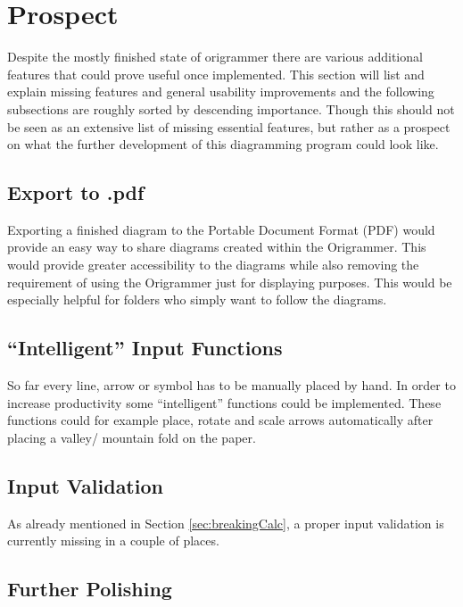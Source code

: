
\section{Prospect}
\label{sec:prospect}

Despite the mostly finished state of \gls{origrammer} there are various additional features that could prove useful once implemented. This section will list and explain missing features and general usability improvements and the following subsections are roughly sorted by descending importance. Though this should not be seen as an extensive list of missing essential features, but rather as a prospect on what the further development of this diagramming program could look like. 

\subsection{Export to .pdf}

Exporting a finished diagram to the Portable Document Format (PDF) would provide an easy way to share diagrams created within the Origrammer. This would provide greater accessibility to the diagrams while also removing the requirement of using the Origrammer just for displaying purposes. This would be especially helpful for folders who simply want to follow the diagrams.

\subsection{``Intelligent'' Input Functions}

So far every line, arrow or symbol has to be manually placed by hand. In order to increase productivity some ``intelligent'' functions could be implemented. These functions could for example place, rotate and scale arrows automatically after placing a valley/ mountain fold on the paper.

\subsection{Input Validation}

As already mentioned in Section \ref{sec:breakingCalc}, a proper input validation is currently missing in a couple of places. 

\subsection{Further Polishing}


